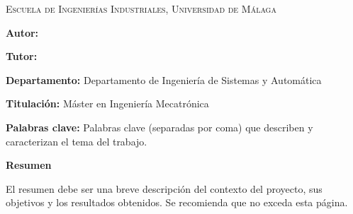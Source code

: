 
\pagestyle{fancy}
\renewcommand{\headrulewidth}{0pt}

\begin{center}
	\scshape
	Escuela de Ingenierías Industriales, Universidad de Málaga
\end{center}

\bigskip

\begin{center}
	\Large \scshape
	\textbf{\tfgtitlename}
\end{center}

\bigskip \bigskip \bigskip

\begin{minipage}{\textwidth}

	\textbf{Autor:} \tfgauthorname

	\medskip

	\textbf{Tutor:} \tfgtutorname

	\medskip



	\textbf{Departamento:} Departamento de Ingeniería de Sistemas y Automática

	\medskip

	\textbf{Titulación:} Máster en Ingeniería Mecatrónica

	\medskip

	\textbf{Palabras clave:} Palabras clave (separadas por coma) que describen y caracterizan el tema del trabajo.

	\bigskip \bigskip


\end{minipage}

\begin{center}
	\textbf{Resumen}
\end{center}

El resumen debe ser una breve descripción del contexto del proyecto,
sus objetivos y los resultados obtenidos. Se recomienda que no exceda
esta página.


\blankpage
